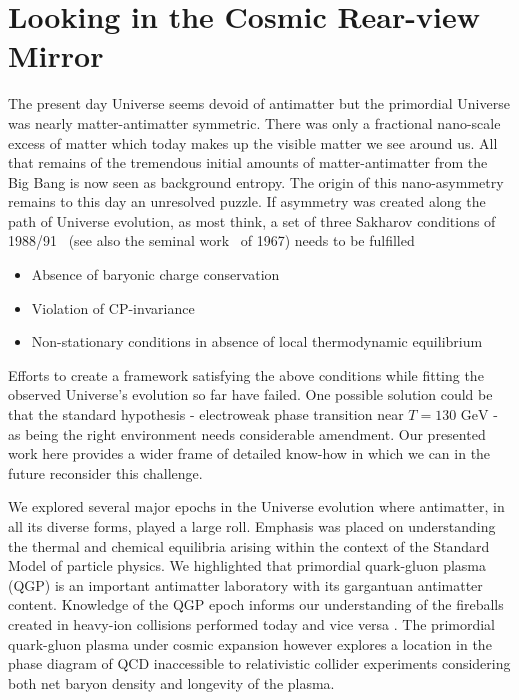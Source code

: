 \documentclass[universe,article,submit,moreauthors,pdftex,a4paper]{Definitions/mdpi}
\newcommand{\GeV}{\text{ GeV}}
\begin{document}
\section{Looking in the Cosmic Rear-view Mirror}\label{Summary}
\noindent The present day Universe seems devoid of antimatter but the primordial Universe was nearly matter-antimatter symmetric. There was only a fractional nano-scale excess of matter which today makes up the visible matter we see around us. All that remains of the tremendous initial amounts of matter-antimatter from the Big Bang is now seen as background entropy. The origin of this nano-asymmetry remains to this day an unresolved puzzle. If asymmetry was created along the path of Universe evolution, as most think, a set of three Sakharov conditions of 1988/91~\cite{Sakharov:1988vdp} (see also the seminal work~\cite{Sakharov:1967dj} of 1967) needs to be fulfilled
\begin{itemize}
    \item Absence of baryonic charge conservation 
    \item Violation of CP-invariance
    \item Non-stationary conditions in absence of local thermodynamic equilibrium
\end{itemize}
Efforts to create a framework satisfying the above conditions while fitting the observed Universe's evolution so far have failed. One possible solution could be that the standard hypothesis - electroweak phase transition near $T=130\GeV$ - as being the right environment needs considerable amendment. Our presented work here provides a wider frame of detailed know-how in which we can in the future reconsider this challenge.

We explored several major epochs in the Universe evolution where antimatter, in all its diverse forms, played a large roll. Emphasis was placed on understanding the thermal and chemical equilibria arising within the context of the Standard Model of particle physics. We highlighted that primordial quark-gluon plasma (QGP) is an important antimatter laboratory with its gargantuan antimatter content. Knowledge of the QGP epoch informs our understanding of the fireballs created in heavy-ion collisions performed today and vice versa \cite{Rafelski:2013qeu,Philipsen:2012nu}. The primordial quark-gluon plasma under cosmic expansion however explores a location in the phase diagram of QCD inaccessible to relativistic collider experiments considering both net baryon density and longevity of the plasma.
\end{document}
